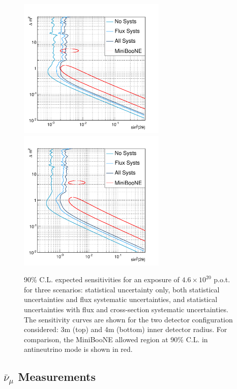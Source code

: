 \begin{figure}[htpb]
\centering
\includegraphics[width=7cm]{./figures/sensi_nuprism_3m_10x10-eps-converted-to.pdf}
\includegraphics[width=7cm]{./figures/sensi_nuprism_4m_10x10-eps-converted-to.pdf}
\caption{90\% C.L. expected sensitivities for an exposure of $4.6 \times 10^20$ p.o.t. for three scenarios: statistical uncertainty only, both statistical uncertainties and flux systematic uncertainties, and statistical uncertainties with flux and cross-section systematic uncertainties. The sensitivity curves are shown for the two detector configuration considered: 3m (top) and 4m (bottom) inner detector radius. For comparison, the MiniBooNE allowed region at 90\% C.L. in antineutrino mode is shown in red.}
\label{fig:sterile_sensi}
\end{figure}


\subsection{$\bar{\nu}_\mu$ Measurements}


